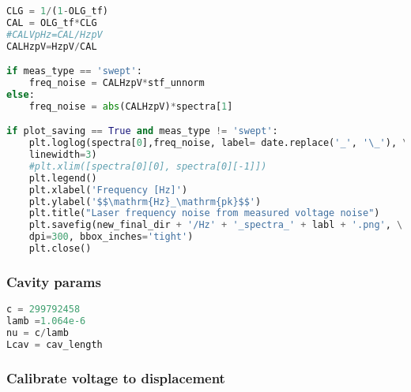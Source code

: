 \begin{lstlisting}[frame=single, language=Python]
CLG = 1/(1-OLG_tf)                                                           # Closed loop gain
CAL = OLG_tf*CLG                                                             # Loop gain calibration factor
#CALVpHz=CAL/HzpV                                                            # Calibrated voltage to frequency
CALHzpV=HzpV/CAL                                                             # Calibration factor using A(f) and OLG(f)

if meas_type == 'swept':                                                     # Calibrate data
    freq_noise = CALHzpV*stf_unnorm
else:
    freq_noise = abs(CALHzpV)*spectra[1]

if plot_saving == True and meas_type != 'swept':                             # if plotting spectra measurement this is plotting and saving the frequency noise if requested
    plt.loglog(spectra[0],freq_noise, label= date.replace('_', '\_'), \
    linewidth=3)
    #plt.xlim([spectra[0][0], spectra[0][-1]])
    plt.legend()
    plt.xlabel('Frequency [Hz]')
    plt.ylabel('$$\mathrm{Hz}_\mathrm{pk}$$')
    plt.title("Laser frequency noise from measured voltage noise")
    plt.savefig(new_final_dir + '/Hz' + '_spectra_' + labl + '.png', \
    dpi=300, bbox_inches='tight')
    plt.close()
\end{lstlisting}

\subsubsection{Cavity params}\label{cavity-params}

\begin{lstlisting}[frame=single, language=Python]
c = 299792458                                                                # Cavity parameters
lamb =1.064e-6
nu = c/lamb
Lcav = cav_length
\end{lstlisting}

\subsubsection{Calibrate voltage to
displacement}\label{calibrate-voltage-to-displacement}

